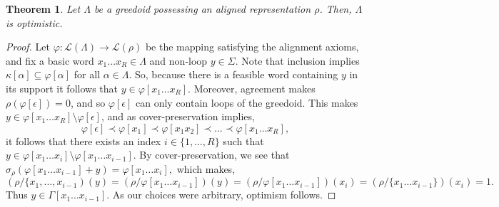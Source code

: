 \documentclass[11pt]{article}
\newtheorem{theorem}{Theorem}[section]
\newcommand{\univ}{\Sigma}
\newcommand{\glang}{\Lambda}
\providecommand{\L}{}
\renewcommand{\L}{\mathscr{L}}
\begin{document}
\begin{theorem}\label{thm:pm->optimism}
    Let $\glang$ be a greedoid possessing an aligned representation $\rho$.
    Then, $\glang$ is optimistic.
\end{theorem}

\begin{proof}
    Let $\varphi:\L(\glang)\to\L(\rho)$ be the mapping satisfying the alignment axioms, and
    fix a basic word $x_1\ldots x_R \in \glang$ and non-loop $y\in\univ$.
    Note that inclusion implies $\kappa[\alpha]\subseteq\varphi[\alpha]$ for all $\alpha \in \glang$.
    So, because there is a feasible word containing $y$ in its support it follows that $y \in \varphi[x_1\ldots x_R]$.
    Moreover, agreement makes $\rho(\varphi[\epsilon]) = 0$, and so $\varphi[\epsilon]$ can only contain loops of the greedoid.
    This makes $y \in \varphi[x_1\ldots x_R]\setminus\varphi[\epsilon]$, and as cover-preservation implies,
    \[
        \varphi[\epsilon] \prec \varphi[x_1]\prec\varphi[x_1x_2]\prec\ldots\prec\varphi[x_1\ldots x_R],
    \]
    it follows that there exists an index $i \in \{1,\ldots, R\}$ such that $y \in \varphi[x_1\ldots x_i]\setminus\varphi[x_1\ldots x_{i-1}]$.
    By cover-preservation, we see that $\sigma_\rho(\varphi[x_1\ldots x_{i-1}] + y) = \varphi[x_1\ldots x_i],$ which makes,
    \[
        (\rho/\{x_1,\ldots,x_{i-1})(y) = (\rho/\varphi[x_1\ldots x_{i-1}])(y) = (\rho/\varphi[x_1\ldots x_{i-1}])(x_i) = (\rho/\{x_1\ldots x_{i-1}\})(x_i) = 1.
    \]
    Thus $y \in \Gamma[x_1 \ldots x_{i-1}]$.
    As our choices were arbitrary, optimism follows.
\end{proof}
\end{document}
